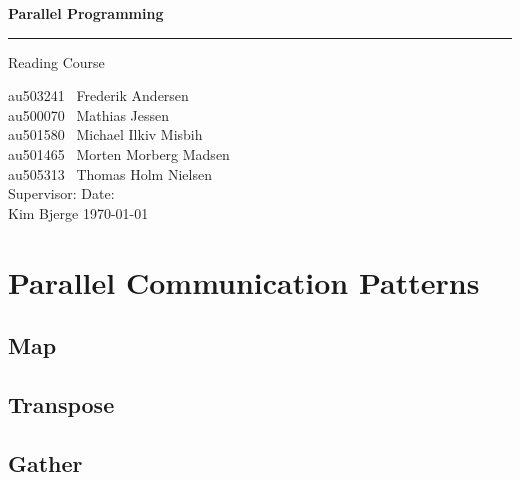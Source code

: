 \documentclass[12px,oz]{report}
\begin{document}
	

\thispagestyle{empty}
	\begin{titlepage}
		\centering
		\vspace*{3\baselineskip}
		{\Huge \bfseries Parallel Programming}
		\rule{\linewidth}{0.5mm}
		\LARGE
		Reading Course
		\\
		\null\vfill
		\begin{flushleft} \large
			au503241 \hspace*{2em} \  Frederik Andersen\\
			au500070 \hspace*{2em} \  Mathias Jessen\\
			au501580 \hspace*{2em} \  Michael Ilkiv Misbih\\
			au501465 \hspace*{2em} \  Morten Morberg Madsen\\
			au505313 \hspace*{2em} \  Thomas Holm Nielsen\\
			\vspace{100pt}
			Supervisor:\hspace{94pt}  Date: \\
			Kim Bjerge \hspace{90pt}  \today\\
		\end{flushleft}
		\vspace*{6\baselineskip}
	\end{titlepage}
	\thispagestyle{empty}
\clearpage
\setcounter{page}{1}

\chapter{Parallel Communication Patterns}
\label{ch-patterns}

	
	\section{Map}
	\label{sec-map}
	
	
	\section{Transpose}
	\label{sec-transpose}
	
	
	\section{Gather}
	\label{sec-gather}
	
	
\end{document}
